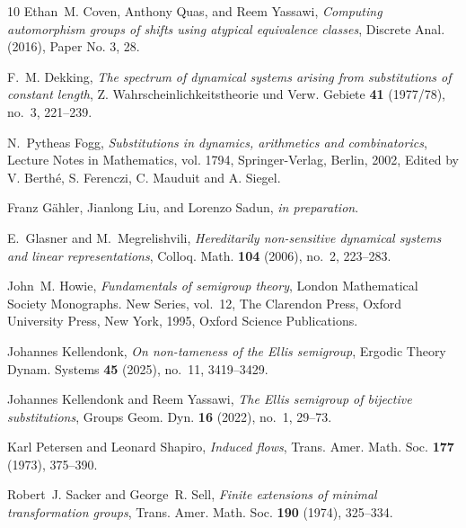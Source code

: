 \documentclass[12pt]{amsart}
\theoremstyle{definition}
\numberwithin{equation}{section}
\begin{document}
\begin{thebibliography}{10}
Ethan~M. Coven, Anthony Quas, and Reem Yassawi, \emph{Computing automorphism
  groups of shifts using atypical equivalence classes}, Discrete Anal. (2016),
  Paper No. 3, 28. 

F.~M. Dekking, \emph{The spectrum of dynamical systems arising from
  substitutions of constant length}, Z. Wahrscheinlichkeitstheorie und Verw.
  Gebiete \textbf{41} (1977/78), no.~3, 221--239. 

N.~Pytheas Fogg, \emph{Substitutions in dynamics, arithmetics and
  combinatorics}, Lecture Notes in Mathematics, vol. 1794, Springer-Verlag,
  Berlin, 2002, Edited by V. Berth\'{e}, S. Ferenczi, C. Mauduit and A. Siegel.

Franz G\"ahler, Jianlong Liu, and Lorenzo Sadun, \emph{in preparation}.

E.~Glasner and M.~Megrelishvili, \emph{Hereditarily non-sensitive dynamical
  systems and linear representations}, Colloq. Math. \textbf{104} (2006),
  no.~2, 223--283. 

John~M. Howie, \emph{Fundamentals of semigroup theory}, London Mathematical
  Society Monographs. New Series, vol.~12, The Clarendon Press, Oxford
  University Press, New York, 1995, Oxford Science Publications. 

Johannes Kellendonk, \emph{On non-tameness of the {E}llis semigroup}, Ergodic
  Theory Dynam. Systems \textbf{45} (2025), no.~11, 3419--3429. 

Johannes Kellendonk and Reem Yassawi, \emph{The {E}llis semigroup of bijective
  substitutions}, Groups Geom. Dyn. \textbf{16} (2022), no.~1, 29--73.

Karl Petersen and Leonard Shapiro, \emph{Induced flows}, Trans. Amer. Math.
  Soc. \textbf{177} (1973), 375--390. 

Robert~J. Sacker and George~R. Sell, \emph{Finite extensions of minimal
  transformation groups}, Trans. Amer. Math. Soc. \textbf{190} (1974),
  325--334. 

\end{thebibliography}
\end{document}
